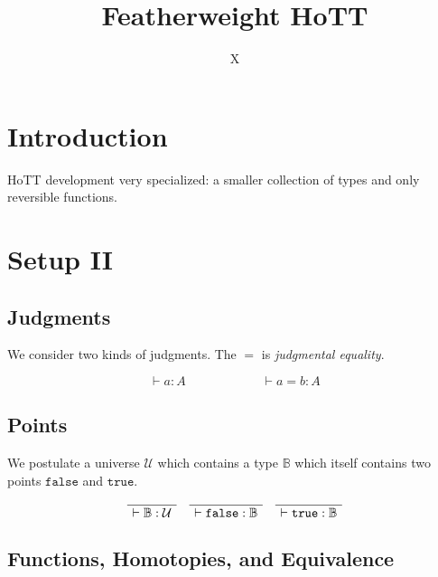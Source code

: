 \documentclass[format=acmlarge,review,natbib]{acmart}
\newcommand{\fc}{\mathtt{false}}
\newcommand{\tc}{\mathtt{true}}
\newcommand{\boolt}{\mathbb{B}}
\newcommand{\univ}{\mathcal{U}}
\newcommand{\proves}{\vdash}
\newcommand{\jdg}[3]{#1 \proves #2 : #3}
\begin{document}
\title{Featherweight HoTT}

\author{X}

\begin{abstract}
\end{abstract}

\maketitle

\section{Introduction}

HoTT development very specialized: a smaller collection of types and only
reversible functions.

\section{Setup II}

\subsection{Judgments}

We consider two kinds of judgments. The $=$ is \emph{judgmental equality}.

\[
\jdg{}{a}{A} \qquad\qquad\qquad \jdg{}{a = b}{A}
\]

\subsection{Points}

We postulate a universe $\univ$ which contains a type $\boolt$ which itself contains
two points $\fc$ and $\tc$.

\[
  \begin{array}{c}
    \AxiomC{}
    \UnaryInfC{$\jdg{}{\boolt}{\univ}$}
    \DisplayProof
    \quad
    \AxiomC{}
    \UnaryInfC{$\jdg{}{\fc}{\boolt}$}
    \DisplayProof
    \quad
    \AxiomC{}
    \UnaryInfC{$\jdg{}{\tc}{\boolt}$}
    \DisplayProof
  \end{array}
\]

\subsection{Functions, Homotopies, and Equivalence}
\end{document}
